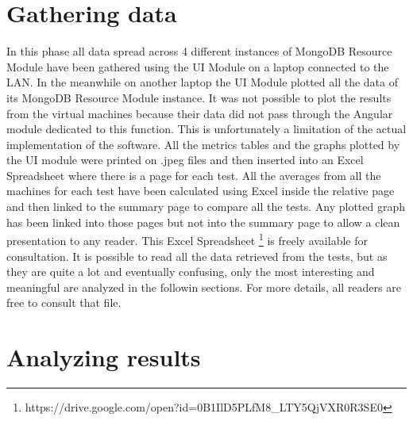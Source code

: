 \section{Gathering data}
\label{sec:3}
In this phase all data spread across 4 different instances of MongoDB Resource Module have been gathered using the UI Module on a laptop connected to the LAN.
In the meanwhile on another laptop the UI Module plotted all the data of its MongoDB Resource Module instance. It was not possible to plot the results from the virtual machines because their data did not pass through the Angular module dedicated to this function. This is unfortunately a limitation of the actual implementation of the software.
All the metrics tables and the graphs plotted by the UI module were printed on .jpeg files and then inserted into an Excel Spreadsheet where there is a page for each test. All the averages from all the machines for each test have been calculated using Excel inside the relative page and then linked to the summary page to compare all the tests. Any plotted graph has been linked into those pages but not into the summary page to allow a clean presentation to any reader.
This Excel Spreadsheet \footnote{https://drive.google.com/open?id=0B1IlD5PLfM8\_LTY5QjVXR0R3SE0} is freely available for consultation. 
It is possible to read all the data retrieved from the tests, but as they are quite a lot and eventually confusing, only the most interesting and meaningful are analyzed in the followin sections. For more details, all readers are free to consult that file.

\section{Analyzing results}
\label{sec:4}

